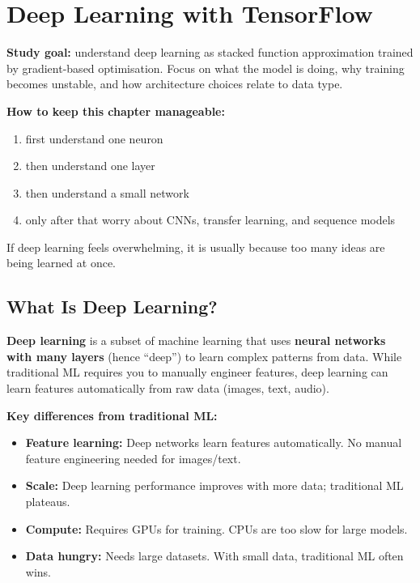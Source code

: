 \documentclass[12pt, a4paper, oneside]{book}
\begin{document}
\chapter{Deep Learning with TensorFlow}

\begin{studybox}
\textbf{Study goal:} understand deep learning as stacked function approximation trained by gradient-based optimisation. Focus on what the model is doing, why training becomes unstable, and how architecture choices relate to data type.
\end{studybox}

\begin{notebox}
\textbf{How to keep this chapter manageable:}
\begin{enumerate}[leftmargin=2em]
    \item first understand one neuron
    \item then understand one layer
    \item then understand a small network
    \item only after that worry about CNNs, transfer learning, and sequence models
\end{enumerate}
If deep learning feels overwhelming, it is usually because too many ideas are being learned at once.
\end{notebox}

\section{What Is Deep Learning?}

\textbf{Deep learning} is a subset of machine learning that uses \textbf{neural networks with many layers} (hence ``deep'') to learn complex patterns from data. While traditional ML requires you to manually engineer features, deep learning can learn features automatically from raw data (images, text, audio).

\textbf{Key differences from traditional ML:}
\begin{itemize}[leftmargin=2em]
    \item \textbf{Feature learning:} Deep networks learn features automatically. No manual feature engineering needed for images/text.
    \item \textbf{Scale:} Deep learning performance improves with more data; traditional ML plateaus.
    \item \textbf{Compute:} Requires GPUs for training. CPUs are too slow for large models.
    \item \textbf{Data hungry:} Needs large datasets. With small data, traditional ML often wins.
\end{itemize}
\end{document}
